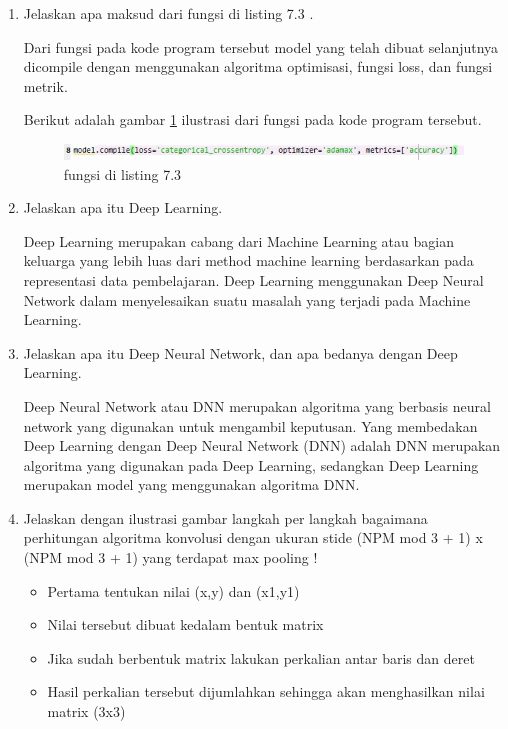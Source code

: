 \begin{enumerate}
\item Jelaskan apa maksud dari fungsi di listing 7.3 .

	\par Dari fungsi pada kode program tersebut model yang telah dibuat selanjutnya dicompile dengan menggunakan algoritma optimisasi, fungsi loss, dan fungsi metrik.
	\par Berikut adalah gambar \ref{no10} ilustrasi dari fungsi pada kode program tersebut.
		\begin{figure}[!hbtp]
		\centering
		\includegraphics[scale=0.4]{figures/chapter7/no10.jpg}
		\caption{fungsi di listing 7.3}
		\label{no10}
		\end{figure}

\item Jelaskan apa itu Deep Learning.
	\par Deep Learning merupakan cabang dari Machine Learning atau bagian keluarga yang lebih luas dari method machine learning berdasarkan pada representasi data pembelajaran. Deep Learning menggunakan Deep Neural Network dalam menyelesaikan suatu masalah yang terjadi pada Machine Learning.

\item Jelaskan apa itu Deep Neural Network, dan apa bedanya dengan Deep Learning.
	\par Deep Neural Network atau DNN merupakan algoritma yang berbasis neural network yang digunakan untuk mengambil keputusan. Yang membedakan Deep Learning dengan  Deep Neural Network (DNN) adalah DNN merupakan algoritma yang digunakan pada Deep Learning, sedangkan Deep Learning merupakan model yang menggunakan algoritma DNN.

\item Jelaskan dengan ilustrasi gambar langkah per langkah bagaimana perhitungan algoritma konvolusi dengan ukuran stide (NPM mod 3 + 1) x (NPM mod 3 + 1) yang terdapat max pooling !

	\begin{itemize}
		\item Pertama tentukan nilai (x,y) dan (x1,y1)
		\item Nilai tersebut dibuat kedalam bentuk matrix
		\item Jika sudah berbentuk matrix lakukan perkalian antar baris dan deret
		\item Hasil perkalian tersebut dijumlahkan sehingga akan menghasilkan nilai matrix (3x3)
	\end{itemize}


\end{enumerate}
